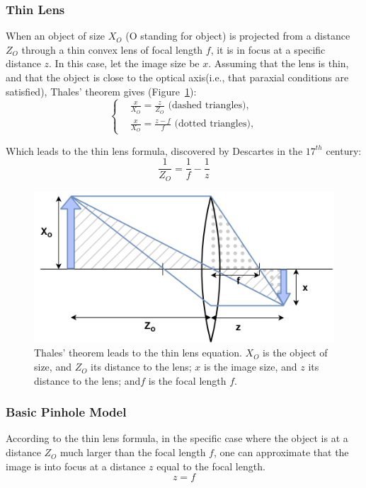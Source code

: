 \subsubsection{Thin Lens}

When an object of size \(X_O\) (O standing for object) is projected from a distance \(Z_O\) through a thin convex lens of focal length \(f\), it is in focus at a specific distance \(z\). In this case, let the image size be \(x\). Assuming that the lens is thin, and that the object is close to the optical axis(i.e., that paraxial conditions are satisfied), Thales' theorem gives (Figure~\ref{fig_thinlens}):
\begin{equation}
  \begin{cases}
  &\frac{x}{X_O} = \frac{z}{Z_O} \text{ (dashed triangles)},\\
  &\frac{x}{X_O} = \frac{z-f}{f} \text{ (dotted triangles)},
  \end{cases}
\end{equation}

Which leads to the thin lens formula, discovered by Descartes in the $17^{th}$ century:
\begin{equation}
    \frac{1}{Z_O} = \frac{1}{f} - \frac{1}{z}
\end{equation}

\begin{figure}[hbtp]
	\centering
	\def\svgwidth{\columnwidth}
	\fontsize{10pt}{10pt}\selectfont
	\includegraphics[width=0.5\linewidth]{"../Chap2/Figures/Thin_Lens.png"}
	\caption{Thales' theorem leads to the thin lens equation. \(X_O\) is the object of size, and \(Z_O\) its distance to the lens; \(x\) is the image size, and \(z\) its distance to the lens; and\(f\) is the focal length \(f\).} 
	\label{fig_thinlens}
\end{figure}

\subsubsection{Basic Pinhole Model}

According to the thin lens formula, in the specific case where the object is at a distance \(Z_O\) much larger than the focal length \(f\), one can approximate that the image is into focus at a distance \(z\) equal to the focal length. 
\begin{equation}
    z=f
\end{equation}

